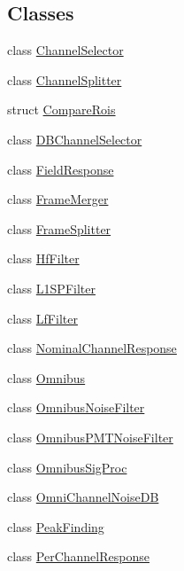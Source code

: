 \subsection*{Classes}
\begin{DoxyCompactItemize}
\item 
class \hyperlink{class_wire_cell_1_1_sig_proc_1_1_channel_selector}{Channel\+Selector}
\item 
class \hyperlink{class_wire_cell_1_1_sig_proc_1_1_channel_splitter}{Channel\+Splitter}
\item 
struct \hyperlink{struct_wire_cell_1_1_sig_proc_1_1_compare_rois}{Compare\+Rois}
\item 
class \hyperlink{class_wire_cell_1_1_sig_proc_1_1_d_b_channel_selector}{D\+B\+Channel\+Selector}
\item 
class \hyperlink{class_wire_cell_1_1_sig_proc_1_1_field_response}{Field\+Response}
\item 
class \hyperlink{class_wire_cell_1_1_sig_proc_1_1_frame_merger}{Frame\+Merger}
\item 
class \hyperlink{class_wire_cell_1_1_sig_proc_1_1_frame_splitter}{Frame\+Splitter}
\item 
class \hyperlink{class_wire_cell_1_1_sig_proc_1_1_hf_filter}{Hf\+Filter}
\item 
class \hyperlink{class_wire_cell_1_1_sig_proc_1_1_l1_s_p_filter}{L1\+S\+P\+Filter}
\item 
class \hyperlink{class_wire_cell_1_1_sig_proc_1_1_lf_filter}{Lf\+Filter}
\item 
class \hyperlink{class_wire_cell_1_1_sig_proc_1_1_nominal_channel_response}{Nominal\+Channel\+Response}
\item 
class \hyperlink{class_wire_cell_1_1_sig_proc_1_1_omnibus}{Omnibus}
\item 
class \hyperlink{class_wire_cell_1_1_sig_proc_1_1_omnibus_noise_filter}{Omnibus\+Noise\+Filter}
\item 
class \hyperlink{class_wire_cell_1_1_sig_proc_1_1_omnibus_p_m_t_noise_filter}{Omnibus\+P\+M\+T\+Noise\+Filter}
\item 
class \hyperlink{class_wire_cell_1_1_sig_proc_1_1_omnibus_sig_proc}{Omnibus\+Sig\+Proc}
\item 
class \hyperlink{class_wire_cell_1_1_sig_proc_1_1_omni_channel_noise_d_b}{Omni\+Channel\+Noise\+DB}
\item 
class \hyperlink{class_wire_cell_1_1_sig_proc_1_1_peak_finding}{Peak\+Finding}
\item 
class \hyperlink{class_wire_cell_1_1_sig_proc_1_1_per_channel_response}{Per\+Channel\+Response}

\end{DoxyCompactItemize}
